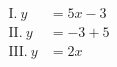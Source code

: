 \documentclass[preview]{standalone}
\begin{document}
\begin{align*}
\text{I.}~y &= 5x-3\\ \text{II.}~ y&= -3+5 \\ \text{III.}~ y &= 2x
\end{align*}
\end{document}
